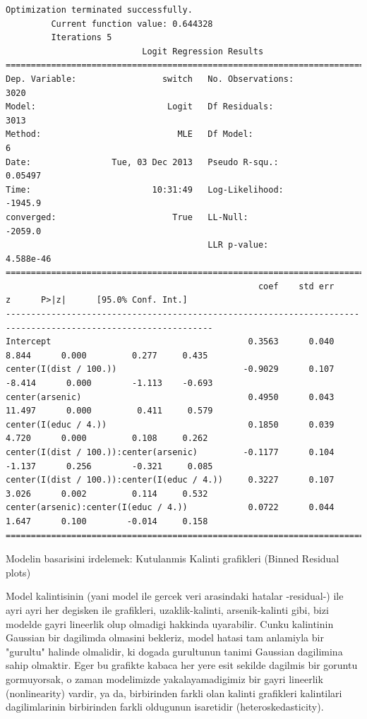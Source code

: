 \documentclass[12pt,fleqn]{article}\usepackage{../common}
\begin{document}
\begin{verbatim}
Optimization terminated successfully.
         Current function value: 0.644328
         Iterations 5
                           Logit Regression Results                           
==============================================================================
Dep. Variable:                 switch   No. Observations:                 3020
Model:                          Logit   Df Residuals:                     3013
Method:                           MLE   Df Model:                            6
Date:                Tue, 03 Dec 2013   Pseudo R-squ.:                 0.05497
Time:                        10:31:49   Log-Likelihood:                -1945.9
converged:                       True   LL-Null:                       -2059.0
                                        LLR p-value:                 4.588e-46
===============================================================================================================
                                                  coef    std err          z      P>|z|      [95.0% Conf. Int.]
---------------------------------------------------------------------------------------------------------------
Intercept                                       0.3563      0.040      8.844      0.000         0.277     0.435
center(I(dist / 100.))                         -0.9029      0.107     -8.414      0.000        -1.113    -0.693
center(arsenic)                                 0.4950      0.043     11.497      0.000         0.411     0.579
center(I(educ / 4.))                            0.1850      0.039      4.720      0.000         0.108     0.262
center(I(dist / 100.)):center(arsenic)         -0.1177      0.104     -1.137      0.256        -0.321     0.085
center(I(dist / 100.)):center(I(educ / 4.))     0.3227      0.107      3.026      0.002         0.114     0.532
center(arsenic):center(I(educ / 4.))            0.0722      0.044      1.647      0.100        -0.014     0.158
===============================================================================================================
\end{verbatim}

Modelin basarisini irdelemek: Kutulanmis Kalinti grafikleri (Binned Residual plots)

Model kalintisinin (yani model ile gercek veri arasindaki hatalar
-residual-) ile ayri ayri her degisken ile grafikleri,
uzaklik-kalinti, arsenik-kalinti gibi, bizi modelde gayri lineerlik
olup olmadigi hakkinda uyarabilir. Cunku kalintinin Gaussian bir
dagilimda olmasini bekleriz, model hatasi tam anlamiyla bir "gurultu"
halinde olmalidir, ki dogada gurultunun tanimi Gaussian dagilimina
sahip olmaktir. Eger bu grafikte kabaca her yere esit sekilde dagilmis
bir goruntu gormuyorsak, o zaman modelimizde yakalayamadigimiz bir
gayri lineerlik (nonlinearity) vardir, ya da, birbirinden farkli olan
kalinti grafikleri kalintilari dagilimlarinin birbirinden farkli
oldugunun isaretidir (heteroskedasticity). 
\end{document}
